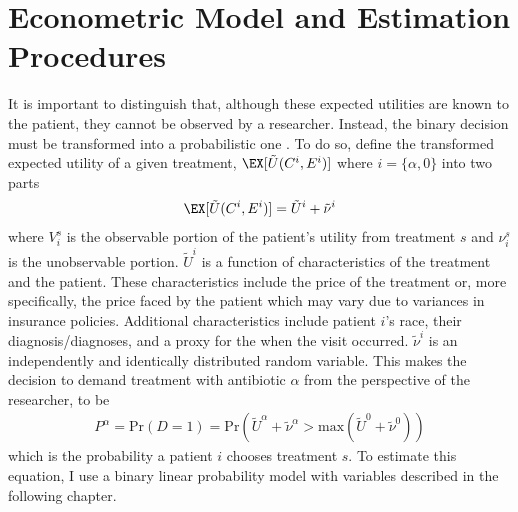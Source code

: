 \section{Econometric Model and Estimation Procedures}
\indent It is important to distinguish that, although these expected utilities are known to the patient, they cannot be observed by a researcher. Instead, the binary decision must be transformed into a probabilistic one \cite{train_discrete_nodate, templeton_household_2008}. To do so, define the transformed expected utility of a given treatment, $\EX[\tilde{U}(C^i,E^i)]$ where $i = \{\alpha,0\}$ into two parts
\begin{eqnarray}
\EX[\tilde{U}(C^i,E^i)] = \tilde{U}^i + \tilde{\nu}^i
\end{eqnarray}
where $V_i^s$ is the observable portion of the patient's utility from treatment $s$ and $\nu_i^s$ is the unobservable portion. $\tilde{U}^i$ is a function of characteristics of the treatment and the patient. These characteristics include the price of the treatment or, more specifically, the price faced by the patient which may vary due to variances in insurance policies. Additional characteristics include patient $i$'s race, their diagnosis/diagnoses, and a proxy for the when the visit occurred. $\tilde{\nu}^i$ is an independently and identically distributed random variable. This makes the decision to demand treatment with antibiotic $\alpha$ from the perspective of the researcher, to be
\begin{eqnarray}
P^\alpha =\text{Pr}(D = 1) = \text{Pr}(\tilde{U}^\alpha + \tilde{\nu}^\alpha > \text{max}(\tilde{U}^0 + \tilde{\nu}^0))
\end{eqnarray}
which is the probability a patient $i$ chooses treatment $s$. To estimate this equation, I use a binary linear probability model with variables described in the following chapter.